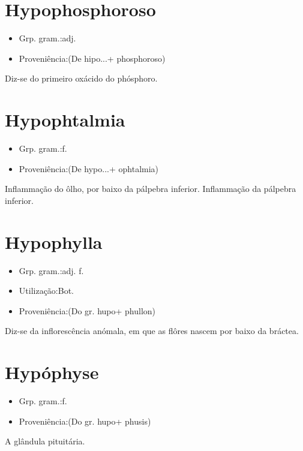 \documentclass{article}
\begin{document}
\section{Hypophosphoroso}
\begin{itemize}
\item {Grp. gram.:adj.}
\end{itemize}
\begin{itemize}
\item {Proveniência:(De \textunderscore hipo...\textunderscore  + \textunderscore phosphoroso\textunderscore )}
\end{itemize}
Diz-se do primeiro oxácido do phósphoro.
\section{Hypophtalmia}
\begin{itemize}
\item {Grp. gram.:f.}
\end{itemize}
\begin{itemize}
\item {Proveniência:(De \textunderscore hypo...\textunderscore  + \textunderscore ophtalmia\textunderscore )}
\end{itemize}
Inflammação do ôlho, por baixo da pálpebra inferior.
Inflammação da pálpebra inferior.
\section{Hypophylla}
\begin{itemize}
\item {Grp. gram.:adj. f.}
\end{itemize}
\begin{itemize}
\item {Utilização:Bot.}
\end{itemize}
\begin{itemize}
\item {Proveniência:(Do gr. \textunderscore hupo\textunderscore  + \textunderscore phullon\textunderscore )}
\end{itemize}
Diz-se da inflorescência anómala, em que as flôres nascem por baixo da bráctea.
\section{Hypóphyse}
\begin{itemize}
\item {Grp. gram.:f.}
\end{itemize}
\begin{itemize}
\item {Proveniência:(Do gr. \textunderscore hupo\textunderscore  + \textunderscore phusis\textunderscore )}
\end{itemize}
A glândula pituitária.
\end{document}
